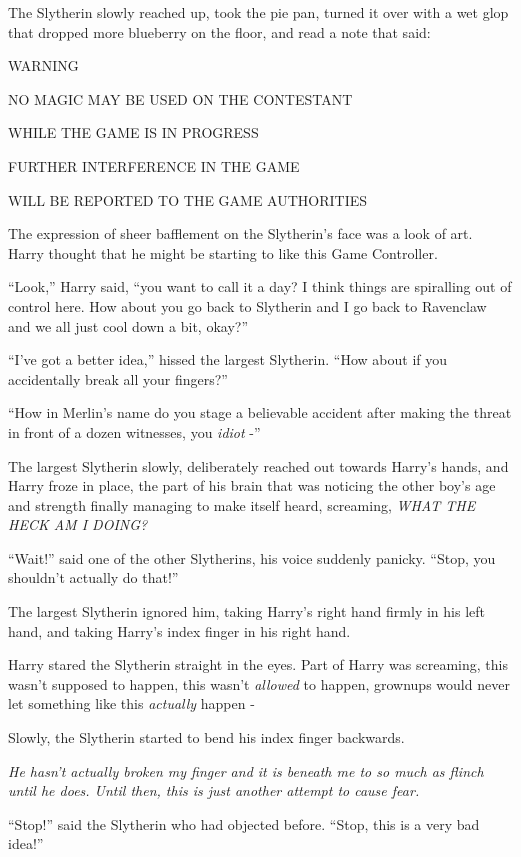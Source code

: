 The Slytherin slowly reached up, took the pie pan, turned it over with a
wet glop that dropped more blueberry on the floor, and read a note that
said:

WARNING

NO MAGIC MAY BE USED ON THE CONTESTANT

WHILE THE GAME IS IN PROGRESS

FURTHER INTERFERENCE IN THE GAME

WILL BE REPORTED TO THE GAME AUTHORITIES

The expression of sheer bafflement on the Slytherin's face was a look of
art. Harry thought that he might be starting to like this Game
Controller.

``Look,'' Harry said, ``you want to call it a day? I think things are
spiralling out of control here. How about you go back to Slytherin and I
go back to Ravenclaw and we all just cool down a bit, okay?''

``I've got a better idea,'' hissed the largest Slytherin. ``How about if
you accidentally break all your fingers?''

``How in Merlin's name do you stage a believable accident after making
the threat in front of a dozen witnesses, you \emph{idiot} -''

The largest Slytherin slowly, deliberately reached out towards Harry's
hands, and Harry froze in place, the part of his brain that was noticing
the other boy's age and strength finally managing to make itself heard,
screaming, \emph{WHAT THE HECK AM I DOING?}

``Wait!'' said one of the other Slytherins, his voice suddenly panicky.
``Stop, you shouldn't actually do that!''

The largest Slytherin ignored him, taking Harry's right hand firmly in
his left hand, and taking Harry's index finger in his right hand.

Harry stared the Slytherin straight in the eyes. Part of Harry was
screaming, this wasn't supposed to happen, this wasn't \emph{allowed} to
happen, grownups would never let something like this \emph{actually}
happen -

Slowly, the Slytherin started to bend his index finger backwards.

\emph{He hasn't actually broken my finger and it is beneath me to so
much as flinch until he does. Until then, this is just another attempt
to cause fear.}

``Stop!'' said the Slytherin who had objected before. ``Stop, this is a
very bad idea!''

